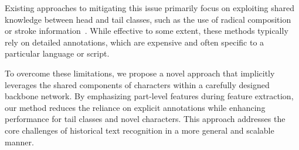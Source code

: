 Existing approaches to mitigating this issue primarily focus on exploiting shared knowledge between head and tail classes, such as the use of radical composition~\cite{obcmk2,sanicdar23,fudanvi} or stroke information~\cite{taktak}. While effective to some extent, these methods typically rely on detailed annotations, which are expensive and often specific to a particular language or script.

To overcome these limitations, we propose a novel approach that implicitly leverages the shared components of characters within a carefully designed backbone network. By emphasizing part-level features during feature extraction, our method reduces the reliance on explicit annotations while enhancing performance for tail classes and novel characters. This approach addresses the core challenges of historical text recognition in a more general and scalable manner.
